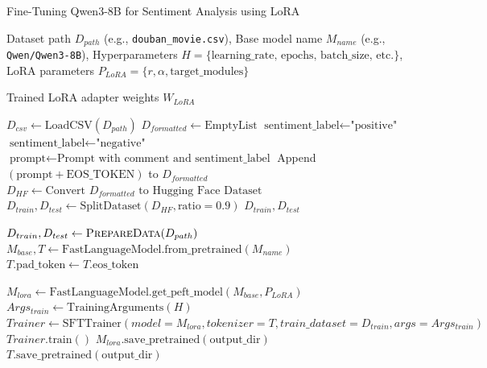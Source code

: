 \documentclass{article}
\begin{document}
\begin{algorithm}[H]
\caption{Fine-Tuning Qwen3-8B for Sentiment Analysis using LoRA}
\label{alg:fine_tuning}
\begin{algorithmic}[1]
\Require 
    Dataset path $D_{path}$ (e.g., \texttt{douban\_movie.csv}),
    Base model name $M_{name}$ (e.g., \texttt{Qwen/Qwen3-8B}),
    Hyperparameters $H = \{ \text{learning\_rate, epochs, batch\_size, etc.} \}$,
    LoRA parameters $P_{LoRA} = \{ r, \alpha, \text{target\_modules} \}$

\Ensure 
    Trained LoRA adapter weights $W_{LoRA}$

\Statex
{}
    \State $D_{csv} \gets \text{LoadCSV}(D_{path})$
    \State $D_{formatted} \gets \text{EmptyList}$
            \State $\text{sentiment\_label} \gets \text{"positive"}$
        \Else
            \State $\text{sentiment\_label} \gets \text{"negative"}$
        \EndIf
        \State $\text{prompt} \gets \text{Prompt with comment and sentiment\_label}$
        \State Append $(\text{prompt} + \text{EOS\_TOKEN})$ to $D_{formatted}$
    \EndFor
    \State $D_{HF} \gets \text{Convert } D_{formatted} \text{ to Hugging Face Dataset}$
    \State $D_{train}, D_{test} \gets \text{SplitDataset}(D_{HF}, \text{ratio}=0.9)$
    \State \Return $D_{train}, D_{test}$
\EndFunction

\Statex
\State $D_{train}, D_{test} \gets \text{\textsc{PrepareData}}(D_{path})$
\State $M_{base}, T \gets \text{FastLanguageModel.from\_pretrained}(M_{name})$ 
\State {}
    \State $T.\text{pad\_token} \gets T.\text{eos\_token}$
\EndIf

\State $M_{lora} \gets \text{FastLanguageModel.get\_peft\_model}(M_{base}, P_{LoRA})$ 
\State $Args_{train} \gets \text{TrainingArguments}(H)$ 
\State $Trainer \gets \text{SFTTrainer}(model=M_{lora}, tokenizer=T, train\_dataset=D_{train}, args=Args_{train})$
\State $Trainer.\text{train}()$ 
\State $M_{lora}.\text{save\_pretrained}(\text{output\_dir})$ 
\State $T.\text{save\_pretrained}(\text{output\_dir})$
\end{algorithmic}
\end{algorithm}
\end{document}
